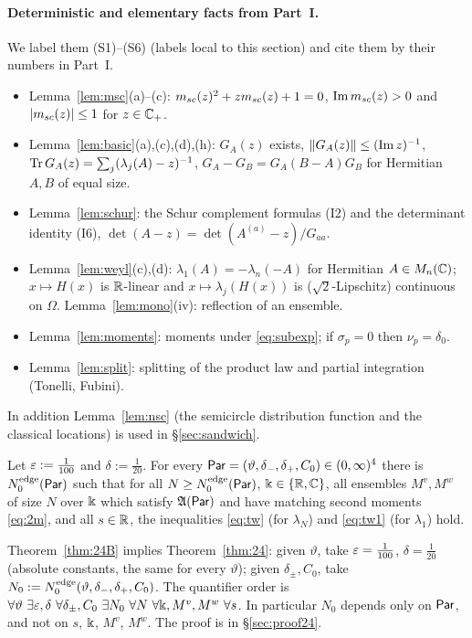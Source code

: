 \paragraph{Deterministic and elementary facts from Part~I.} We label them (S1)--(S6) (labels local to this section) and cite them by their numbers in Part~I.
\begin{itemize}\itemsep0pt
\item[(S1)] Lemma~\ref{lem:msc}(a)--(c): $m_{sc}(z)^2+zm_{sc}(z)+1=0$, $\operatorname{Im}m_{sc}(z)>0$ and $|m_{sc}(z)|\le1$ for $z\in\mathbb{C}_+$.
\item[(S2)] Lemma~\ref{lem:basic}(a),(c),(d),(h): $G_A(z)$ exists, $\|G_A(z)\|\le(\operatorname{Im} z)^{-1}$, $\operatorname{Tr} G_A(z)=\sum_j(\lambda_j(A)-z)^{-1}$,
$G_A-G_B=G_A(B-A)G_B$ for Hermitian $A,B$ of equal size.
\item[(S3)] Lemma~\ref{lem:schur}: the Schur complement formulas (I2) and the determinant identity (I6), $\det(A-z)=\det(A^{(a)}-z)/G_{aa}$.
\item[(S4)] Lemma~\ref{lem:weyl}(c),(d): $\lambda_1(A)=-\lambda_n(-A)$ for Hermitian $A\in M_n(\mathbb{C})$; $x\mapsto H(x)$ is $\mathbb{R}$-linear and
$x\mapsto\lambda_j(H(x))$ is ($\sqrt2$-Lipschitz) continuous on $\Omega$. Lemma~\ref{lem:mono}(iv): reflection of an ensemble.
\item[(S5)] Lemma~\ref{lem:moments}: moments under \eqref{eq:subexp}; if $\sigma_p=0$ then $\nu_p=\delta_0$.
\item[(S6)] Lemma~\ref{lem:split}: splitting of the product law and partial integration (Tonelli, Fubini).
\end{itemize}
In addition Lemma~\ref{lem:nsc} (the semicircle distribution function and the classical locations) is used in \S\ref{sec:sandwich}.

\begin{theorem}\label{thm:24B}
Let $\varepsilon:=\frac1{100}$ and $\delta:=\frac1{20}$. For every $\mathsf{Par}=(\vartheta,\delta_-,\delta_+,C_0)\in(0,\infty)^4$ there is $N_0^{\rm edge}(\mathsf{Par})$ such that for
all $N\ge N_0^{\rm edge}(\mathsf{Par})$, $\Bbbk\in\{\mathbb{R},\mathbb{C}\}$, all ensembles $M^v,M^w$ of size $N$ over $\Bbbk$ which satisfy $\mathfrak{A}(\mathsf{Par})$ and have matching second moments
\eqref{eq:2m}, and all $s\in\mathbb{R}$, the inequalities \eqref{eq:tw} (for $\lambda_N$) and \eqref{eq:tw1} (for $\lambda_1$) hold.
\end{theorem}
\noindent Theorem~\ref{thm:24B} implies Theorem~\ref{thm:24}: given $\vartheta$, take $\varepsilon=\frac1{100}$, $\delta=\frac1{20}$ (absolute constants, the
same for every $\vartheta$); given $\delta_\pm,C_0$, take $N_0:=N_0^{\rm edge}(\vartheta,\delta_-,\delta_+,C_0)$. The quantifier order is
$\forall\vartheta\ \exists\e,\delta\ \forall\delta_\pm,C_0\ \exists N_0\ \forall N\ \forall\K,M^v,M^w\ \forall s$.
In particular $N_0$ depends only on $\mathsf{Par}$, and not on $s$, $\Bbbk$, $M^v$, $M^w$. The proof is in \S\ref{sec:proof24}.

